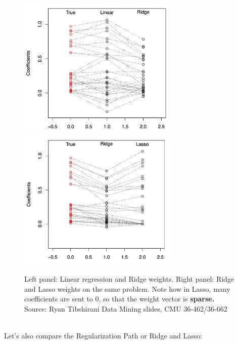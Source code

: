\documentclass[11pt]{article}
\begin{document}
        \begin{figure}[H]
      \centering
      \includegraphics[width=3in]{ridge_coefs.jpeg}
      \,\,
      \includegraphics[width=3in]{lasso_coefs.jpeg}
      \caption{Left panel: Linear regression and Ridge weights. 
        Right panel: Ridge and Lasso weights on the same problem. Note how in Lasso, many
        coefficients are sent to $0$, so that the weight vector is {\bf sparse.}
        Source: Ryan Tibshirani Data Mining slides, CMU 36-462/36-662 }
    \end{figure}
~\\
Let's also compare the Regularization Path or Ridge and Lasso:
\end{document}
